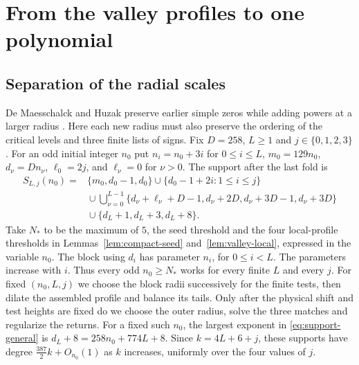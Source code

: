 \section{From the valley profiles to one polynomial}\label{sec:assembly}
\subsection{Separation of the radial scales}\label{subsec:inductive-valleys}
De Maesschalck and Huzak preserve earlier simple zeros while adding
powers at a larger radius \cite[\S3.1]{DMH}. Here each new radius must
also preserve the ordering of the critical levels and three finite lists
of signs. Fix $D=258$, $L\ge1$ and
$j\in\{0,1,2,3\}$. For an odd initial integer $n_0$ put
$n_i=n_0+3i$ for $0\le i\le L$, $m_0=129n_0$, $d_\nu=Dn_\nu$, $\ell_0=2j$, and $\ell_\nu=0$
for $\nu>0$. The support after the last fold is
\begin{equation}\label{eq:support-general}
\begin{aligned}
 S_{L,j}(n_0)={}&\{m_0,d_0-1,d_0\}\cup\{d_0-1+2i:1\le i\le j\}\\
 &{}\cup\bigcup_{\nu=0}^{L-1}
 \{d_\nu+\ell_\nu+D-1,d_\nu+2D,d_\nu+3D-1,d_\nu+3D\}\\
 &{}\cup\{d_L+1,d_L+3,d_L+8\}.
\end{aligned}
\end{equation}
Take $N_*$ to be the maximum of $5$, the seed threshold and the four
local-profile thresholds in Lemmas~\ref{lem:compact-seed}
and~\ref{lem:valley-local}, expressed in the variable $n_0$.
The block using $d_i$ has parameter $n_i$, for $0\le i<L$. The parameters increase with $i$.
Thus every odd $n_0\ge N_*$ works for every finite $L$ and every $j$.
For fixed $(n_0,L,j)$ we choose the block radii successively for the
finite tests, then dilate the assembled profile and balance its tails.
Only after the physical shift and test heights are fixed do we choose
the outer radius, solve the three matches and regularize the returns.
For a fixed such $n_0$, the largest exponent in \eqref{eq:support-general}
is $d_L+8=258n_0+774L+8$. Since $k=4L+6+j$, these supports have degree
$\tfrac{387}{2}k+O_{n_0}(1)$ as $k$ increases, uniformly over the four
values of $j$.


